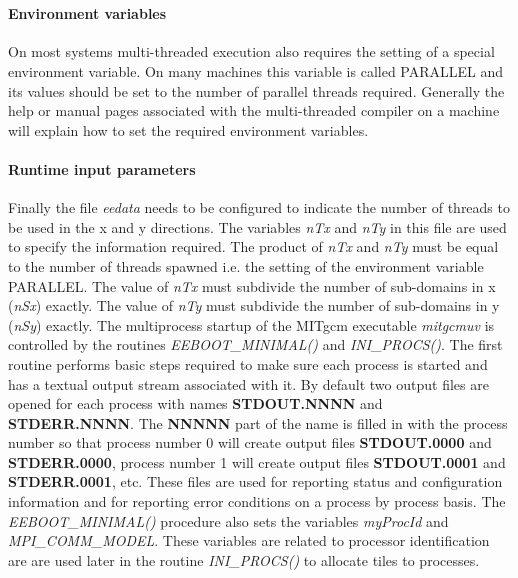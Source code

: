  \\


\paragraph{Environment variables}
On most systems multi-threaded execution also requires the setting of
a special environment variable. On many machines this variable is
called PARALLEL and its values should be set to the number of parallel
threads required. Generally the help or manual pages associated with
the multi-threaded compiler on a machine will explain how to set the
required environment variables.

\paragraph{Runtime input parameters}
Finally the file {\em eedata} needs to be configured to indicate the
number of threads to be used in the x and y directions.  The variables
{\em nTx} and {\em nTy} in this file are used to specify the
information required. The product of {\em nTx} and {\em nTy} must be
equal to the number of threads spawned i.e.  the setting of the
environment variable PARALLEL.  The value of {\em nTx} must subdivide
the number of sub-domains in x ({\em nSx}) exactly. The value of {\em
  nTy} must subdivide the number of sub-domains in y ({\em nSy})
exactly.  The multiprocess startup of the MITgcm executable {\em
  mitgcmuv} is controlled by the routines {\em EEBOOT\_MINIMAL()} and
{\em INI\_PROCS()}. The first routine performs basic steps required to
make sure each process is started and has a textual output stream
associated with it. By default two output files are opened for each
process with names {\bf STDOUT.NNNN} and {\bf STDERR.NNNN}.  The {\bf
  NNNNN} part of the name is filled in with the process number so that
process number 0 will create output files {\bf STDOUT.0000} and {\bf
  STDERR.0000}, process number 1 will create output files {\bf
  STDOUT.0001} and {\bf STDERR.0001}, etc. These files are used for
reporting status and configuration information and for reporting error
conditions on a process by process basis.  The {\em EEBOOT\_MINIMAL()}
procedure also sets the variables {\em myProcId} and {\em
  MPI\_COMM\_MODEL}.  These variables are related to processor
identification are are used later in the routine {\em INI\_PROCS()} to
allocate tiles to processes.

